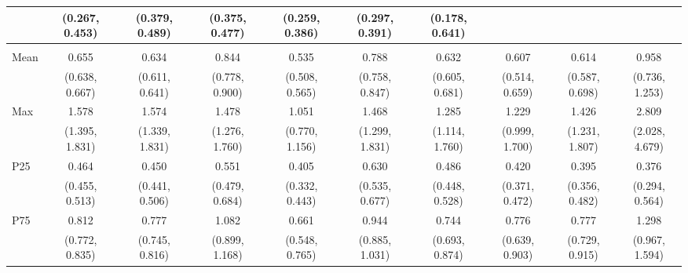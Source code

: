 {\begin{tabular}{l|c|c|c|c|c|c|c|c|c}
& {\scriptsize (0.267, 0.453)}
& {\scriptsize (0.379, 0.489)}
& {\scriptsize (0.375, 0.477)}
& {\scriptsize (0.259, 0.386)}
& {\scriptsize (0.297, 0.391)}
& {\scriptsize (0.178, 0.641)}
\\ [0.1cm]
\hline
\noalign{\smallskip}
\multicolumn{10}{l}{\textbf{Effect with Leads and Lags}} \\
\noalign{\smallskip}
\hline
Mean
& 0.655 & 0.634 & 0.844 & 0.535 & 0.788 & 0.632 & 0.607 & 0.614 & 0.958 \\
& {\scriptsize (0.638, 0.667)}
& {\scriptsize (0.611, 0.641)}
& {\scriptsize (0.778, 0.900)}
& {\scriptsize (0.508, 0.565)}
& {\scriptsize (0.758, 0.847)}
& {\scriptsize (0.605, 0.681)}
& {\scriptsize (0.514, 0.659)}
& {\scriptsize (0.587, 0.698)}
& {\scriptsize (0.736, 1.253)}
\\ [0.1cm]
\hline
Max
& 1.578 & 1.574 & 1.478 & 1.051 & 1.468 & 1.285 & 1.229 & 1.426 & 2.809 \\
& {\scriptsize (1.395, 1.831)}
& {\scriptsize (1.339, 1.831)}
& {\scriptsize (1.276, 1.760)}
& {\scriptsize (0.770, 1.156)}
& {\scriptsize (1.299, 1.831)}
& {\scriptsize (1.114, 1.760)}
& {\scriptsize (0.999, 1.700)}
& {\scriptsize (1.231, 1.807)}
& {\scriptsize (2.028, 4.679)}
\\ [0.1cm]
\hline
P25
& 0.464 & 0.450 & 0.551 & 0.405 & 0.630 & 0.486 & 0.420 & 0.395 & 0.376 \\
& {\scriptsize (0.455, 0.513)}
& {\scriptsize (0.441, 0.506)}
& {\scriptsize (0.479, 0.684)}
& {\scriptsize (0.332, 0.443)}
& {\scriptsize (0.535, 0.677)}
& {\scriptsize (0.448, 0.528)}
& {\scriptsize (0.371, 0.472)}
& {\scriptsize (0.356, 0.482)}
& {\scriptsize (0.294, 0.564)}
\\ [0.1cm]
\hline
P75
& 0.812 & 0.777 & 1.082 & 0.661 & 0.944 & 0.744 & 0.776 & 0.777 & 1.298 \\
& {\scriptsize (0.772, 0.835)}
& {\scriptsize (0.745, 0.816)}
& {\scriptsize (0.899, 1.168)}
& {\scriptsize (0.548, 0.765)}
& {\scriptsize (0.885, 1.031)}
& {\scriptsize (0.693, 0.874)}
& {\scriptsize (0.639, 0.903)}
& {\scriptsize (0.729, 0.915)}
& {\scriptsize (0.967, 1.594)}
\\ [0.1cm]
\hline
\hline
\end{tabular}
}
